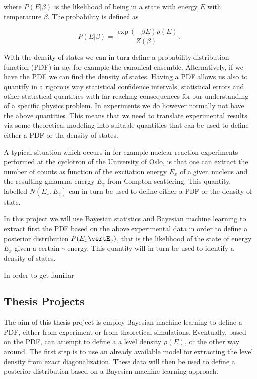 \documentclass[%
oneside,                 %
final,                   %
10pt]{article}
\begin{document}
where $P(E\vert\beta)$ is the likelihood of being in a state with
energy $E$ with temperature $\beta$. The probability is defined as

\[
P(E\vert\beta) = \frac{\exp{(-\beta E)}\rho(E)}{Z(\beta)}. 
\]

With the density of states we can in turn define a probability
distribution function (PDF) in say for example the canonical
ensemble. Alternatively, if we have the PDF we can find the density of
states. Having a PDF allows us also to quantify in a rigorous way statistical
confidence intervals, statistical errors and other statistical quantities with far reaching
consequences for our understanding of a specific physics problem. 
In experiments we do however normally not have the above
quantities. This means that we need to translate experimental results
via some theoretical modeling into suitable quantities that can be
used to define either a PDF or the density of states.

A typical situation which occurs in for example nuclear reaction
experiments performed at the cyclotron of the University of Oslo, is
that one can extract the number of counts as function of the
excitation energy $E_x$ of a given nucleus and the resulting gmamma
energy $E_{\gamma}$ from Compton scattering. This quantity, labelled
$N(E_x,E_{\gamma})$ can in turn be used to define either a PDF or the density of state.


In this project we will use Bayesian statistics and Bayesian machine
learning to extract first the PDF based on the above experimental data
in order to define a posterior distribution $P(E_x\vertE_{\gamma})$,
that is the likelihood of the state of energy $E_x$ given a certain
$\gamma$-energy.  This quantity will in turn be used to identify a
density of states.

In order to get familiar 



\subsection*{Thesis Projects}

The aim of this thesis project is employ Bayesian machine learning to
define a PDF, either from experiment or from theoretical simulations.
Eventually, based on the PDF, can attempt to define a a level density
$\rho(E)$, or the other way around. The first step is to use an
already available model for extracting the level density from exact
diagonalization. These data will then be used to define a posterior
distribution based on a Bayesian machine learning approach.
\end{document}
